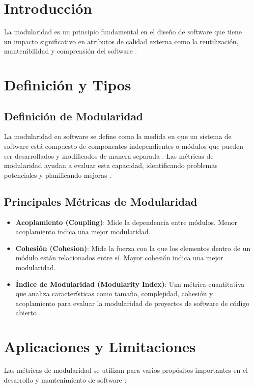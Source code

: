 \documentclass[a4,10pt]{article}
\begin{document}
\section{Introducción}
La modularidad es un principio fundamental en el diseño de software que tiene un impacto significativo en atributos de calidad externa como la reutilización, mantenibilidad y comprensión del software \cite{xiang2019}.

\section{Definición y Tipos}

\subsection{Definición de Modularidad}
La modularidad en software se define como la medida en que un sistema de software está compuesto de componentes independientes o módulos que pueden ser desarrollados y modificados de manera separada \cite{xiang2019}. Las métricas de modularidad ayudan a evaluar esta capacidad, identificando problemas potenciales y planificando mejoras \cite{rahardjo2011}.

\subsection{Principales Métricas de Modularidad}
\begin{itemize}
    \item \textbf{Acoplamiento (Coupling)}: Mide la dependencia entre módulos. Menor acoplamiento indica una mejor modularidad.
    \item \textbf{Cohesión (Cohesion)}: Mide la fuerza con la que los elementos dentro de un módulo están relacionados entre sí. Mayor cohesión indica una mejor modularidad.
    \item \textbf{Índice de Modularidad (Modularity Index)}: Una métrica cuantitativa que analiza características como tamaño, complejidad, cohesión y acoplamiento para evaluar la modularidad de proyectos de software de código abierto \cite{rahardjo2011}.
\end{itemize}

\section{Aplicaciones y Limitaciones}
Las métricas de modularidad se utilizan para varios propósitos importantes en el desarrollo y mantenimiento de software \cite{xiang2019}:
\end{document}
